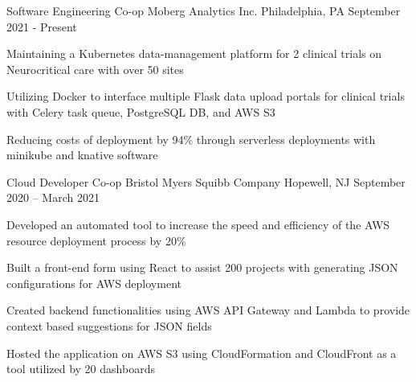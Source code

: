 

\begin{cventries}

  
	\cventry
	{Software Engineering Co-op}
	{Moberg Analytics Inc.}
	{Philadelphia, PA}
	{September 2021 - Present}
	{\begin{cvitems}
		\item {Maintaining a Kubernetes data-management platform for 2 clinical trials on Neurocritical care with over 50 sites}
		\item {Utilizing Docker to interface multiple Flask data upload portals for clinical trials with Celery task queue, PostgreSQL DB, and AWS S3}
		\item {Reducing costs of deployment by 94\% through serverless deployments with minikube and knative software}
		\end{cvitems}}
	

	\vspace{-2mm}
	\cventry
	{Cloud Developer Co-op}
	{Bristol Myers Squibb Company}
	{Hopewell, NJ}
	{September 2020 – March 2021}
	{\begin{cvitems}
		\item {Developed an automated tool to increase the speed and efficiency of the AWS resource deployment process by 20\% }
        \item {Built a front-end form using React to assist 200 projects with generating JSON configurations for AWS deployment}
        \item {Created backend functionalities using AWS API Gateway and Lambda to provide context based suggestions for JSON fields}
        \item {Hosted the application on AWS S3 using CloudFormation and CloudFront as a tool utilized by 20 dashboards}
		\end{cvitems}}
	

\end{cventries}
